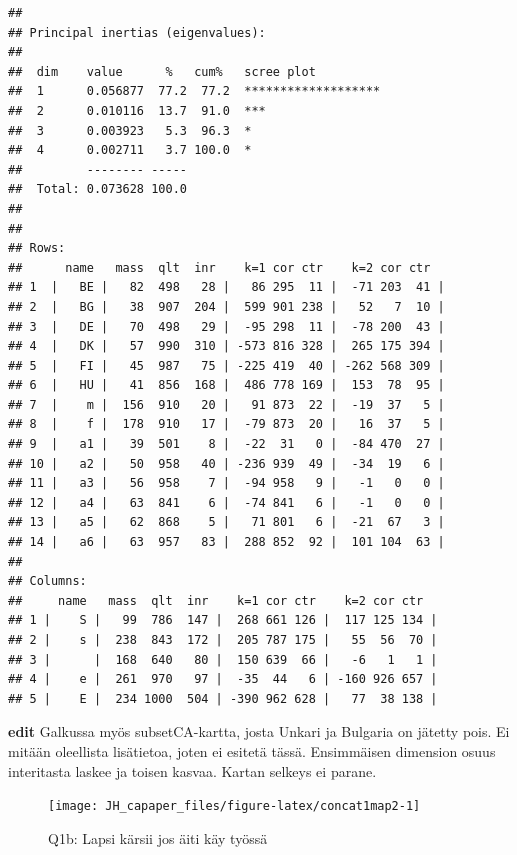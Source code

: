 \documentclass[
  finnish,
]{book}
\begin{document}
\begin{verbatim}
## 
## Principal inertias (eigenvalues):
## 
##  dim    value      %   cum%   scree plot               
##  1      0.056877  77.2  77.2  *******************      
##  2      0.010116  13.7  91.0  ***                      
##  3      0.003923   5.3  96.3  *                        
##  4      0.002711   3.7 100.0  *                        
##         -------- -----                                 
##  Total: 0.073628 100.0                                 
## 
## 
## Rows:
##      name   mass  qlt  inr    k=1 cor ctr    k=2 cor ctr  
## 1  |   BE |   82  498   28 |   86 295  11 |  -71 203  41 |
## 2  |   BG |   38  907  204 |  599 901 238 |   52   7  10 |
## 3  |   DE |   70  498   29 |  -95 298  11 |  -78 200  43 |
## 4  |   DK |   57  990  310 | -573 816 328 |  265 175 394 |
## 5  |   FI |   45  987   75 | -225 419  40 | -262 568 309 |
## 6  |   HU |   41  856  168 |  486 778 169 |  153  78  95 |
## 7  |    m |  156  910   20 |   91 873  22 |  -19  37   5 |
## 8  |    f |  178  910   17 |  -79 873  20 |   16  37   5 |
## 9  |   a1 |   39  501    8 |  -22  31   0 |  -84 470  27 |
## 10 |   a2 |   50  958   40 | -236 939  49 |  -34  19   6 |
## 11 |   a3 |   56  958    7 |  -94 958   9 |   -1   0   0 |
## 12 |   a4 |   63  841    6 |  -74 841   6 |   -1   0   0 |
## 13 |   a5 |   62  868    5 |   71 801   6 |  -21  67   3 |
## 14 |   a6 |   63  957   83 |  288 852  92 |  101 104  63 |
## 
## Columns:
##     name   mass  qlt  inr    k=1 cor ctr    k=2 cor ctr  
## 1 |    S |   99  786  147 |  268 661 126 |  117 125 134 |
## 2 |    s |  238  843  172 |  205 787 175 |   55  56  70 |
## 3 |      |  168  640   80 |  150 639  66 |   -6   1   1 |
## 4 |    e |  261  970   97 |  -35  44   6 | -160 926 657 |
## 5 |    E |  234 1000  504 | -390 962 628 |   77  38 138 |
\end{verbatim}

\textbf{edit} Galkussa myös subsetCA-kartta, josta Unkari ja Bulgaria on jätetty pois.
Ei mitään oleellista lisätietoa, joten ei esitetä tässä. Ensimmäisen dimension
osuus interitasta laskee ja toisen kasvaa. Kartan selkeys ei parane.

\begin{figure}

{\centering \texttt{[image: JH\_capaper\_files/figure-latex/concat1map2-1]} 

}

\caption{Q1b: Lapsi kärsii jos äiti käy työssä}\label{fig:concat1map2}
\end{figure}
\end{document}
